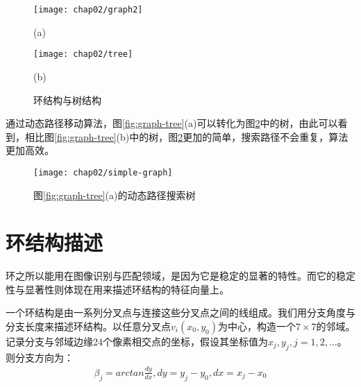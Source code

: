 \begin{figure}[H]
\centering
  \begin{minipage}[b]{1\textwidth} 
      \centering 
       \texttt{[image: chap02/graph2]}
       \centerline{(a)}\medskip
    \end{minipage}
  \begin{minipage}[b]{1\textwidth}
    \centering
    \texttt{[image: chap02/tree]}
    \centerline{(b)}\medskip
  \end{minipage}
\caption{环结构与树结构}
\label{fig:cycle-tree}
\end{figure}

通过动态路径移动算法，图\ref{fig:graph-tree}(a)可以转化为图\ref{fig:simple-tree}中的树，由此可以看到，相比图\ref{fig:graph-tree}(b)中的树，图\ref{fig:simple-tree}更加的简单，搜索路径不会重复，算法更加高效。

\begin{figure}[H]
\centering
\texttt{[image: chap02/simple-graph]}
\caption{图\ref{fig:graph-tree}(a)的动态路径搜索树}
\label{fig:simple-tree}
\end{figure}


\section{环结构描述}
\label{}
环之所以能用在图像识别与匹配领域，是因为它是稳定的显著的特性。而它的稳定性与显著性则体现在用来描述环结构的特征向量上。

一个环结构是由一系列分叉点与连接这些分叉点之间的线组成。我们用分支角度与分支长度来描述环结构。以任意分叉点$v_i(x_0, y_0)$为中心，构造一个$7 \times 7$的邻域。记录分支与邻域边缘24个像素相交点的坐标，假设其坐标值为$x_j, y_j, j=1, 2, \ldots$。则分支方向为：
\begin{align}
\beta_j = arctan\frac{dy}{dx}, dy = y_j - y_0, dx = x_j - x_0 
\end{align}

